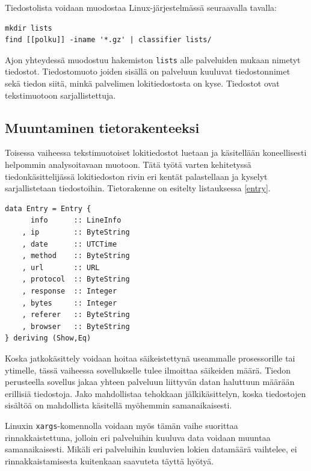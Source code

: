 Tiedostolista voidaan muodostaa
Linux-järjestelmässä seuraavalla tavalla:

\begin{lstlisting}[language=bashshell]
mkdir lists
find [[polku]] -iname '*.gz' | classifier lists/
\end{lstlisting} 
\label{filelist}

Ajon yhteydessä muodostuu hakemiston \texttt{lists} alle palveluiden
mukaan nimetyt tiedostot. Tiedostomuoto joiden sisällä on palveluun kuuluvat
tiedostonnimet sekä tiedon siitä, minkä palvelimen lokitiedostosta on kyse. Tiedostot ovat tekstimuotoon sarjallistettuja.

\subsection{Muuntaminen tietorakenteeksi}

Toisessa vaiheessa tekstimuotoiset lokitiedostot luetaan ja
käsitellään koneellisesti helpommin analysoitavaan muotoon. Tätä työtä
varten kehitetyssä tiedonkäsittelijässä lokitiedoston rivin eri kentät
palastellaan ja kyselyt sarjallistetaan tiedostoihin. Tietorakenne on
esitelty listauksessa \ref{entry}.

\lstset{language=MyHaskell}

\begin{lstlisting}[float=h,caption=Yhden lokirivin säilövä tietorakenne.,label=entry,aboveskip=1cm]
data Entry = Entry {
      info      :: LineInfo
    , ip        :: ByteString
    , date      :: UTCTime
    , method    :: ByteString
    , url       :: URL
    , protocol  :: ByteString
    , response  :: Integer
    , bytes     :: Integer
    , referer   :: ByteString
    , browser   :: ByteString
} deriving (Show,Eq)
\end{lstlisting}

Koska jatkokäsittely voidaan hoitaa säikeistettynä useammalle
prosessorille tai ytimelle, tässä vaiheessa sovellukselle tulee
ilmoittaa säikeiden määrä. Tiedon perusteella sovellus jakaa yhteen
palveluun liittyvän datan haluttuun määrään erillisiä tiedostoja. Jako
mahdollistaa tehokkaan jälkikäsittelyn, koska tiedostojen sisältöä on
mahdollista käsitellä myöhemmin samanaikaisesti.

Linuxin \texttt{xargs}-komennolla voidaan myös tämän vaihe suorittaa
rinnakkaistettuna, jolloin eri palveluihin kuuluva data voidaan
muuntaa samanaikaisesti. Mikäli eri palveluihin kuuluvien lokien datamäärä
vaihtelee, ei rinnakkaistamisesta kuitenkaan saavuteta täyttä hyötyä.

